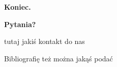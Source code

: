 \begin{frame}

\begin{center}

\vfill
\mbox{}

{\textbf{Koniec.} }

\vspace{0.5cm}

{ \textbf{Pytania?} }

\vspace{1cm}

\begin{minipage}{0.8\textwidth}
\footnotesize
tutaj jakiś kontakt do nas \\
\end{minipage}

\vfill
\mbox{}

\end{center}

{\tiny
\begin{thebibliography}{9}
   {Bibliografię też można jakąś podać}
\end{thebibliography}
}

\end{frame}
